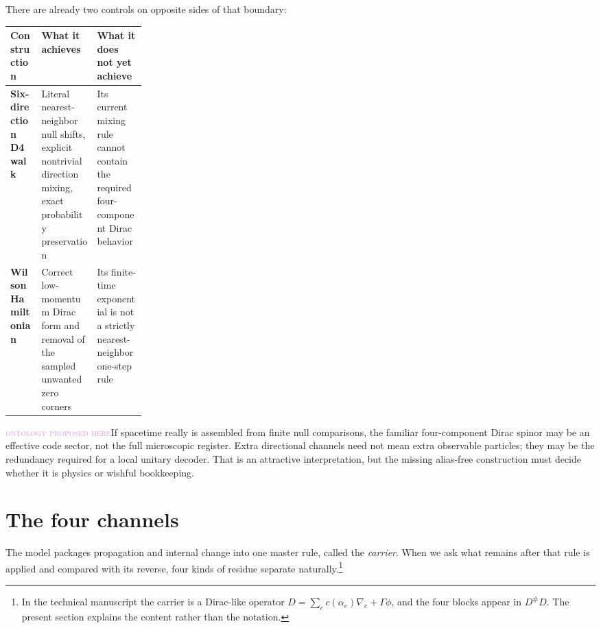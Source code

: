 \documentclass[11pt]{article}
\newcommand{\Olabel}{\textcolor{plum}{\textsc{ontology proposed here}}}
\begin{document}
There are already two controls on opposite sides of that boundary:

\begin{center}
\small
\begin{tabularx}{0.94\linewidth}{@{}>{\bfseries}p{0.23\linewidth}XX@{}}
\toprule
Construction & What it achieves & What it does not yet achieve\\
\midrule
Six-direction D4 walk & Literal nearest-neighbor null shifts, explicit
nontrivial direction mixing, exact probability preservation & Its current
mixing rule cannot contain the required four-component Dirac behavior\\
Wilson Hamiltonian & Correct low-momentum Dirac form and removal of the sampled
unwanted zero corners & Its finite-time exponential is not a strictly
nearest-neighbor one-step rule\\
\bottomrule
\end{tabularx}
\end{center}

\Olabel\quad If spacetime really is assembled from finite null comparisons,
the familiar four-component Dirac spinor may be an effective code sector, not
the full microscopic register.  Extra directional channels need not mean extra
observable particles; they may be the redundancy required for a local unitary
decoder.  That is an attractive interpretation, but the missing alias-free
construction must decide whether it is physics or wishful bookkeeping.

\section{The four channels}

The model packages propagation and internal change into one master rule, called
the \emph{carrier}.  When we ask what remains after that rule is applied and
compared with its reverse, four kinds of residue separate naturally.\footnote{In
the technical manuscript the carrier is a Dirac-like operator
$D=\sum_e c(\alpha_e)\nabla_e+\Gamma\phi$, and the four blocks appear in
$D^\#D$.  The present section explains the content rather than the notation.}
\end{document}
